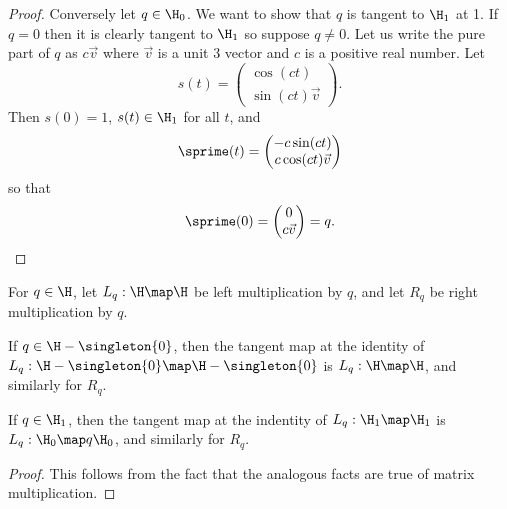 \documentclass[oneside,12pt]{amsart}
\begin{document}
\begin{proof}
Conversely let $q\in\H_0$. We want to show that $q$ is tangent to $\H_1$ at 1. 
If $q=0$ then it is clearly tangent to $\H_1$ so suppose $q\not=0$.
Let us write the pure part of $q$ as $c\vec{v}$ where $\vec{v}$ is a unit 3 vector and $c$ is a positive real number.
Let
$$
s(t) = 
\begin{pmatrix}
\cos(ct) \\ \sin(ct) \vec{v}
\end{pmatrix}
.$$
Then $s(0) = 1$, $s(t)\in \H_1$ for all $t$, and
$$
\sprime(t) = 
\begin{pmatrix}
-c\sin(ct) \\ c\cos(ct) \vec{v}
\end{pmatrix}
$$
so that 
$$
\sprime(0) = 
\begin{pmatrix}
0 \\ c\vec{v}
\end{pmatrix}
= q.
$$
\end{proof}

\begin{definition}
For $q\in\H$, let $L_q:\H\map\H$ be left multiplication by $q$,
and let $R_q$ be right multiplication by $q$.
\end{definition}

\begin{lemma}
\label{lemma:mult_deriv}
If $q\in\H-\singleton{0}$, then the tangent map at the identity
 of $L_q:\H-\singleton{0}\map\H-\singleton{0}$ is
$L_q:\H\map\H$, and similarly for $R_q$.

If $q\in\H_1$, then the tangent map at the indentity of $L_q:\H_1\map\H_1$ is
$L_q:\H_0\map q\H_0$, and similarly for $R_q$. 
\end{lemma}
\begin{proof}
This follows from the fact that the analogous facts are true of matrix multiplication.
\end{proof}
\end{document}
